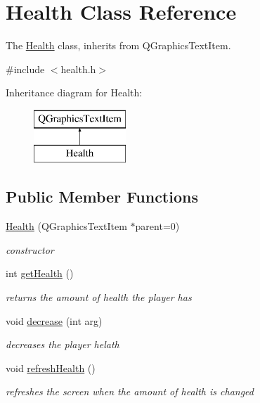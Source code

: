 \hypertarget{classHealth}{}\section{Health Class Reference}
\label{classHealth}


The \hyperlink{classHealth}{Health} class, inherits from Q\+Graphics\+Text\+Item.  




{\ttfamily \#include $<$health.\+h$>$}

Inheritance diagram for Health\+:\begin{figure}[H]
\begin{center}
\leavevmode
\includegraphics[height=2.000000cm]{classHealth}
\end{center}
\end{figure}
\subsection*{Public Member Functions}
\begin{DoxyCompactItemize}
\item 
\mbox{\label{classHealth_a942d89536a25defa8bbac43174cf349c}} 
\hyperlink{classHealth_a942d89536a25defa8bbac43174cf349c}{Health} (Q\+Graphics\+Text\+Item $\ast$parent=0)
\begin{DoxyCompactList}\small\item\em constructor \end{DoxyCompactList}\item 
\mbox{\label{classHealth_adc5f045b9f6937c592e196821d7a6878}} 
int \hyperlink{classHealth_adc5f045b9f6937c592e196821d7a6878}{get\+Health} ()
\begin{DoxyCompactList}\small\item\em returns the amount of health the player has \end{DoxyCompactList}\item 
\mbox{\label{classHealth_af7d311e68d9214d3479774d9b8e3aaf4}} 
void \hyperlink{classHealth_af7d311e68d9214d3479774d9b8e3aaf4}{decrease} (int arg)
\begin{DoxyCompactList}\small\item\em decreases the player helath \end{DoxyCompactList}\item 
\mbox{\label{classHealth_a08c580a1587c46316e39b766e4e06fb8}} 
void \hyperlink{classHealth_a08c580a1587c46316e39b766e4e06fb8}{refresh\+Health} ()
\begin{DoxyCompactList}\small\item\em refreshes the screen when the amount of health is changed \end{DoxyCompactList}\end{DoxyCompactItemize}


